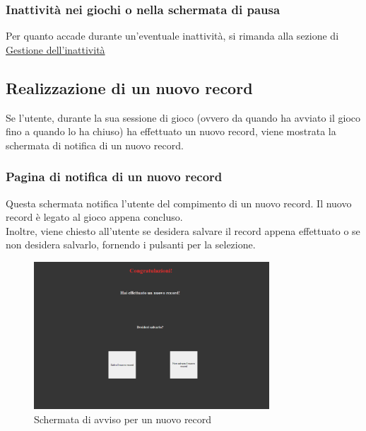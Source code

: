 \subsubsection{Inattività nei giochi o nella schermata di pausa}
Per quanto accade durante un'eventuale inattività, si rimanda alla sezione di \hyperref[sec:inactivity]{Gestione dell'inattività}
\newpage
\subsection{Realizzazione di un nuovo record}
Se l'utente, durante la sua sessione di gioco (ovvero da quando ha avviato il gioco fino a quando lo ha chiuso) ha effettuato un nuovo record, viene mostrata la schermata di notifica di un nuovo record.
\subsubsection{Pagina di notifica di un nuovo record}
Questa schermata notifica l'utente del compimento di un nuovo record. Il nuovo record è legato al gioco appena concluso.\\
Inoltre, viene chiesto all'utente se desidera salvare il record appena effettuato o se non desidera salvarlo, fornendo i pulsanti per la selezione.
\begin{figure}[h]
    \centering
    \includegraphics[width=250pt]{images/product/schermataNuovoRecord.png}
    \caption{Schermata di avviso per un nuovo record}
    \label{fig:schermataNuovoRecord}
\end{figure}
